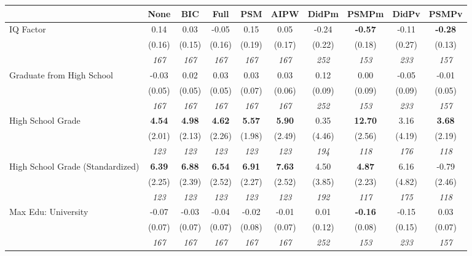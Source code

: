 \begin{tabular}{l c c c c c c c c c}
\toprule
 & None & BIC & Full & PSM & AIPW & DidPm & PSMPm & DidPv & PSMPv \\
\midrule
IQ Factor & 0.14 & 0.03 & -0.05 & 0.15 & 0.05 & -0.24 & \textbf{-0.57} & -0.11 & \textbf{-0.28} \\
& (0.16) & (0.15) & (0.16) & (0.19) & (0.17) & (0.22) & (0.18) & (0.27) & (0.13) \\
& \textit{ 167 } & \textit{ 167 } & \textit{ 167 } & \textit{ 167 } & \textit{ 167 } & \textit{ 252 } & \textit{ 153 } & \textit{ 233 } & \textit{ 157 } \\
Graduate from High School & -0.03 & 0.02 & 0.03 & 0.03 & 0.03 & 0.12 & 0.00 & -0.05 & -0.01 \\
& (0.05) & (0.05) & (0.05) & (0.07) & (0.06) & (0.09) & (0.09) & (0.09) & (0.05) \\
& \textit{ 167 } & \textit{ 167 } & \textit{ 167 } & \textit{ 167 } & \textit{ 167 } & \textit{ 252 } & \textit{ 153 } & \textit{ 233 } & \textit{ 157 } \\
High School Grade & \textbf{ 4.54 } & \textbf{ 4.98 } & \textbf{ 4.62 } & \textbf{5.57} & \textbf{5.90} & 0.35 & \textbf{12.70} & 3.16 & \textbf{3.68} \\
& (2.01) & (2.13) & (2.26) & (1.98) & (2.49) & (4.46) & (2.56) & (4.19) & (2.19) \\
& \textit{ 123 } & \textit{ 123 } & \textit{ 123 } & \textit{ 123 } & \textit{ 123 } & \textit{ 194 } & \textit{ 118 } & \textit{ 176 } & \textit{ 118 } \\
High School Grade (Standardized) & \textbf{ 6.39 } & \textbf{ 6.88 } & \textbf{ 6.54 } & \textbf{6.91} & \textbf{7.63} & 4.50 & \textbf{4.87} & 6.16 & -0.79 \\
& (2.25) & (2.39) & (2.52) & (2.27) & (2.52) & (3.85) & (2.23) & (4.82) & (2.46) \\
& \textit{ 123 } & \textit{ 123 } & \textit{ 123 } & \textit{ 123 } & \textit{ 123 } & \textit{ 192 } & \textit{ 117 } & \textit{ 175 } & \textit{ 118 } \\
Max Edu: University & -0.07 & -0.03 & -0.04 & -0.02 & -0.01 & 0.01 & \textbf{-0.16} & -0.15 & 0.03 \\
& (0.07) & (0.07) & (0.07) & (0.08) & (0.07) & (0.12) & (0.08) & (0.15) & (0.07) \\
& \textit{ 167 } & \textit{ 167 } & \textit{ 167 } & \textit{ 167 } & \textit{ 167 } & \textit{ 252 } & \textit{ 153 } & \textit{ 233 } & \textit{ 157 } \\

\end{tabular}
